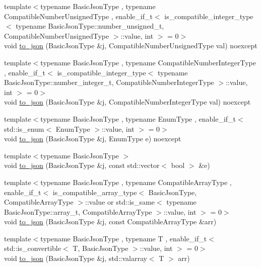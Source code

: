\begin{DoxyCompactItemize}
\item 
{\footnotesize template$<$typename Basic\+Json\+Type , typename Compatible\+Number\+Unsigned\+Type , enable\+\_\+if\+\_\+t$<$ is\+\_\+compatible\+\_\+integer\+\_\+type$<$ typename Basic\+Json\+Type\+::number\+\_\+unsigned\+\_\+t, Compatible\+Number\+Unsigned\+Type $>$\+::value, int $>$  = 0$>$ }\\void \hyperlink{namespacenlohmann_1_1detail_ae5fd66b5517b3b5a6c6b9fd9f29ba8dc}{to\+\_\+json} (Basic\+Json\+Type \&j, Compatible\+Number\+Unsigned\+Type val) noexcept
\item 
{\footnotesize template$<$typename Basic\+Json\+Type , typename Compatible\+Number\+Integer\+Type , enable\+\_\+if\+\_\+t$<$ is\+\_\+compatible\+\_\+integer\+\_\+type$<$ typename Basic\+Json\+Type\+::number\+\_\+integer\+\_\+t, Compatible\+Number\+Integer\+Type $>$\+::value, int $>$  = 0$>$ }\\void \hyperlink{namespacenlohmann_1_1detail_a91fe576be579c8c2fdd14610605c6dd2}{to\+\_\+json} (Basic\+Json\+Type \&j, Compatible\+Number\+Integer\+Type val) noexcept
\item 
{\footnotesize template$<$typename Basic\+Json\+Type , typename Enum\+Type , enable\+\_\+if\+\_\+t$<$ std\+::is\+\_\+enum$<$ Enum\+Type $>$\+::value, int $>$  = 0$>$ }\\void \hyperlink{namespacenlohmann_1_1detail_a0c8b159dba71981d6c555d284cf6e2bf}{to\+\_\+json} (Basic\+Json\+Type \&j, Enum\+Type e) noexcept
\item 
{\footnotesize template$<$typename Basic\+Json\+Type $>$ }\\void \hyperlink{namespacenlohmann_1_1detail_aeca6fb5fede5ed1e12a4420d98a5692b}{to\+\_\+json} (Basic\+Json\+Type \&j, const std\+::vector$<$ bool $>$ \&e)
\item 
{\footnotesize template$<$typename Basic\+Json\+Type , typename Compatible\+Array\+Type , enable\+\_\+if\+\_\+t$<$ is\+\_\+compatible\+\_\+array\+\_\+type$<$ Basic\+Json\+Type, Compatible\+Array\+Type $>$\+::value or std\+::is\+\_\+same$<$ typename Basic\+Json\+Type\+::array\+\_\+t, Compatible\+Array\+Type $>$\+::value, int $>$  = 0$>$ }\\void \hyperlink{namespacenlohmann_1_1detail_a3afebc132c5ff83f9cd160e52030fdfd}{to\+\_\+json} (Basic\+Json\+Type \&j, const Compatible\+Array\+Type \&arr)
\item 
{\footnotesize template$<$typename Basic\+Json\+Type , typename T , enable\+\_\+if\+\_\+t$<$ std\+::is\+\_\+convertible$<$ T, Basic\+Json\+Type $>$\+::value, int $>$  = 0$>$ }\\void \hyperlink{namespacenlohmann_1_1detail_afd18898316e9a20a6458877d2ee27d31}{to\+\_\+json} (Basic\+Json\+Type \&j, std\+::valarray$<$ T $>$ arr)

\end{DoxyCompactItemize}
